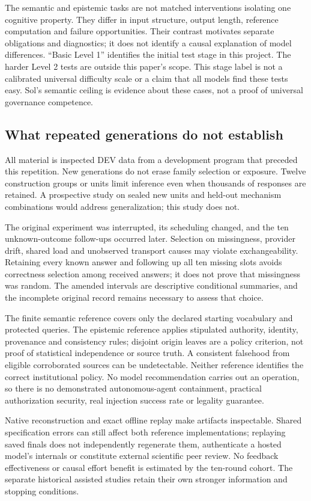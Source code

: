 \documentclass[a4paper,preprint,12pt,numbers,nopreprintline]{elsarticle}
\begin{document}
The semantic and epistemic tasks are not matched interventions isolating one cognitive property. They differ in input structure, output length, reference computation and failure opportunities. Their contrast motivates separate obligations and diagnostics; it does not identify a causal explanation of model differences. ``Basic Level 1'' identifies the initial test stage in this project. The harder Level 2 tests are outside this paper's scope. This stage label is not a calibrated universal difficulty scale or a claim that all models find these tests easy. Sol's semantic ceiling is evidence about these cases, not a proof of universal governance competence.

\subsection{What repeated generations do not establish}
All material is inspected DEV data from a development program that preceded this repetition. New generations do not erase family selection or exposure. Twelve construction groups or units limit inference even when thousands of responses are retained. A prospective study on sealed new units and held-out mechanism combinations would address generalization; this study does not.

The original experiment was interrupted, its scheduling changed, and the ten unknown-outcome follow-ups occurred later. Selection on missingness, provider drift, shared load and unobserved transport causes may violate exchangeability. Retaining every known answer and following up all ten missing slots avoids correctness selection among received answers; it does not prove that missingness was random. The amended intervals are descriptive conditional summaries, and the incomplete original record remains necessary to assess that choice.

The finite semantic reference covers only the declared starting vocabulary and protected queries. The epistemic reference applies stipulated authority, identity, provenance and consistency rules; disjoint origin leaves are a policy criterion, not proof of statistical independence or source truth. A consistent falsehood from eligible corroborated sources can be undetectable. Neither reference identifies the correct institutional policy. No model recommendation carries out an operation, so there is no demonstrated autonomous-agent containment, practical authorization security, real injection success rate or legality guarantee.

Native reconstruction and exact offline replay make artifacts inspectable. Shared specification errors can still affect both reference implementations; replaying saved finals does not independently regenerate them, authenticate a hosted model's internals or constitute external scientific peer review. No feedback effectiveness or causal effort benefit is estimated by the ten-round cohort. The separate historical assisted studies retain their own stronger information and stopping conditions.
\end{document}

